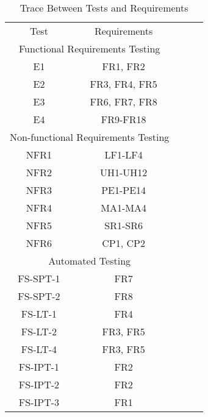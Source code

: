 \documentclass[12pt, titlepage]{article}
\begin{document}
	\begin{table}[h!]
		\centering
		\begin{tabular}{|cc|lll}
			\cline{1-2}
			\multicolumn{1}{|c|}{Test} & Requirements & \multicolumn{1}{c}{} & \multicolumn{1}{c}{} &  \\ \cline{1-2}
			\multicolumn{2}{|c|}{Functional Requirements Testing} &  &  &  \\ \cline{1-2}
			\multicolumn{1}{|c|}{E1} & FR1, FR2 &  &  &  \\ \cline{1-2}
			\multicolumn{1}{|c|}{E2} & FR3, FR4, FR5 &  &  &  \\ \cline{1-2}
			\multicolumn{1}{|c|}{E3} & FR6, FR7, FR8 &  &  &  \\ \cline{1-2}
			\multicolumn{1}{|c|}{E4} & FR9-FR18 &  &  &  \\ \cline{1-2}
			
			\multicolumn{2}{|c|}{Non-functional Requirements Testing} &  &  &  \\ \cline{1-2}
			\multicolumn{1}{|c|}{NFR1} & LF1-LF4 &  &  &  \\ \cline{1-2}
			\multicolumn{1}{|c|}{NFR2} & UH1-UH12 &  &  &  \\ \cline{1-2}
			\multicolumn{1}{|c|}{NFR3} & PE1-PE14 &  &  &  \\ \cline{1-2}
			\multicolumn{1}{|c|}{NFR4} & MA1-MA4 &  &  &  \\ \cline{1-2}
			\multicolumn{1}{|c|}{NFR5} & SR1-SR6 &  &  &  \\ \cline{1-2}
			\multicolumn{1}{|c|}{NFR6} & CP1, CP2&  &  &  \\ \cline{1-2}
			
			\multicolumn{2}{|c|}{Automated Testing} &  &  &  \\ \cline{1-2}
			\multicolumn{1}{|c|}{FS-SPT-1} & FR7 &  &  &  \\ \cline{1-2}
			\multicolumn{1}{|c|}{FS-SPT-2} & FR8 &  &  &  \\ \cline{1-2}
			\multicolumn{1}{|c|}{FS-LT-1} & FR4 &  &  &  \\ \cline{1-2}
			\multicolumn{1}{|c|}{FS-LT-2} & FR3, FR5 &  &  &  \\ \cline{1-2}
			\multicolumn{1}{|c|}{FS-LT-4} & FR3, FR5&  &  &  \\ \cline{1-2}
			\multicolumn{1}{|c|}{FS-IPT-1} & FR2 &  &  &  \\ \cline{1-2}
			\multicolumn{1}{|c|}{FS-IPT-2} & FR2 &  &  &  \\ \cline{1-2}
			\multicolumn{1}{|c|}{FS-IPT-3} & FR1 &  &  &  \\ \cline{1-2}
			
			
			
			
		\end{tabular}
		\caption{Trace Between Tests and Requirements}
		\label{tab:my-table}
	\end{table}	
	
\end{document}
